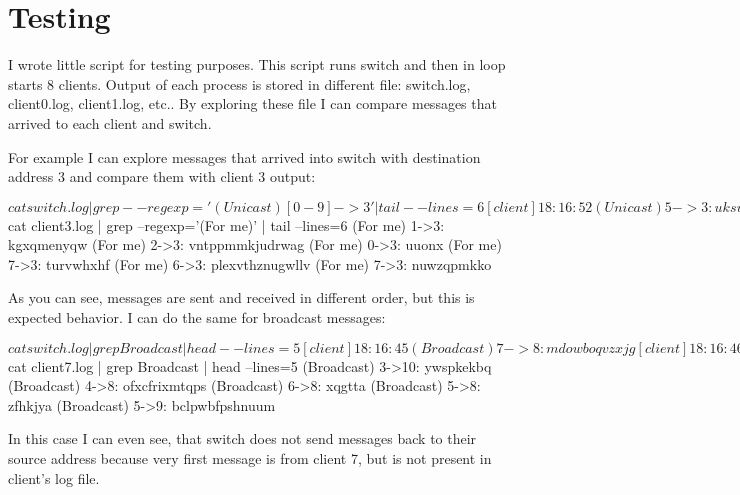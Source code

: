 \documentclass[11pt,a4paper,titlepage]{article}
\begin{document}
\section{Testing}
I wrote little script for testing purposes. This script runs switch and then in loop starts 8 clients. Output of each process is stored in different file: switch.log, client0.log, client1.log, etc.. By exploring these file I can compare messages that arrived to each client and switch.

For example I can explore messages that arrived into switch with destination address 3 and compare them with client 3 output:
\begin{bashcode}
$ cat switch.log | grep --regexp='(Unicast) [0-9]->3' | tail --lines=6
[client]  18:16:52 (Unicast) 5->3: uksvykjm
[client]  18:16:58 (Unicast) 1->3: kgxqmenyqw
[client]  18:17:03 (Unicast) 2->3: vntppmmkjudrwag
[client]  18:17:05 (Unicast) 0->3: uuonx
[client]  18:17:05 (Unicast) 7->3: turvwhxhf
[client]  18:17:05 (Unicast) 6->3: plexvthznugwllv
$ cat client3.log | grep --regexp='(For me)' | tail --lines=6
(For me) 1->3: kgxqmenyqw
(For me) 2->3: vntppmmkjudrwag
(For me) 0->3: uuonx
(For me) 7->3: turvwhxhf
(For me) 6->3: plexvthznugwllv
(For me) 7->3: nuwzqpmkko
\end{bashcode}
As you can see, messages are sent and received in different order, but this is expected behavior. I can do the same for broadcast messages:
\begin{bashcode}
$ cat switch.log | grep Broadcast | head --lines=5
[client]  18:16:45 (Broadcast) 7->8: mdowboqvzxjg
[client]  18:16:46 (Broadcast) 3->10: ywspkekbq
[client]  18:16:46 (Broadcast) 4->8: ofxcfrixmtqps
[client]  18:16:46 (Broadcast) 6->8: xqgtta
[client]  18:16:46 (Broadcast) 5->8: zfhkjya
$ cat client7.log | grep Broadcast | head --lines=5
(Broadcast) 3->10: ywspkekbq
(Broadcast) 4->8: ofxcfrixmtqps
(Broadcast) 6->8: xqgtta
(Broadcast) 5->8: zfhkjya
(Broadcast) 5->9: bclpwbfpshnuum
\end{bashcode}
In this case I can even see, that switch does not send messages back to their source address because very first message is from client 7, but is not present in client's log file.
\end{document}
